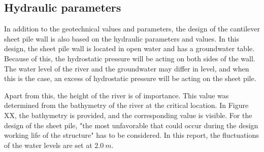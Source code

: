 \subsection{Hydraulic parameters}
\label{section:hydraulic_parameters}

In addition to the geotechnical values and parameters, the design of the cantilever sheet pile wall is also based on the hydraulic parameters and values. In this design, the sheet pile wall is located in open water and has a groundwater table. Because of this, the hydrostatic pressure will be acting on both sides of the wall. The water level of the river and the groundwater may differ in level, and when this is the case, an excess of hydrostatic pressure will be acting on the sheet pile. 

Apart from this, the height of the river is of importance. This value was determined from the bathymetry of the river at the critical location. In Figure XX, the bathymetry is provided, and the corresponding value is visible. For the design of the sheet pile, "the most unfavorable that could occur during the design working life of the structure" has to be considered. In this report, the fluctuations of the water levels are set at $2.0 \ m$. 








